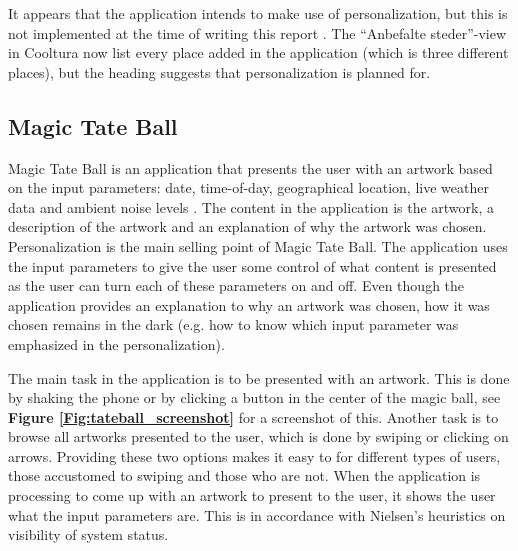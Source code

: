 It appears that the application intends to make use of personalization, but this is not implemented at the time of writing this report \cite{AS4}. The “Anbefalte steder”-view in Cooltura now list every place added in the application (which is three different places), but the heading suggests that personalization is planned for. 

\subsection{Magic Tate Ball}

Magic Tate Ball is an application that presents the user with an artwork based on the input parameters: date, time-of-day, geographical location, live weather data and ambient noise levels \cite{AS5}. The content in the application is the artwork, a description of the artwork and an explanation of why the artwork was chosen. Personalization is the main selling point of Magic Tate Ball. The application uses the input parameters to give the user some control of what content is presented as the user can turn each of these parameters on and off. Even though the application provides an explanation to why an artwork was chosen, how it was chosen remains in the dark (e.g. how to know which input parameter was emphasized in the personalization).\newline


The main task in the application is to be presented with an artwork. This is done by shaking the phone or by clicking a button in the center of the magic ball, see \textbf{Figure \ref{Fig:tateball_screenshot}} for a screenshot of this. Another task is to browse all artworks presented to the user, which is done by swiping or clicking on arrows. Providing these two options makes it easy to for different types of users, those accustomed to swiping and those who are not. When the application is processing to come up with an artwork to present to the user, it shows the user what the input parameters are. This is in accordance with Nielsen's heuristics on visibility of system status. \newline

\cleardoublepage